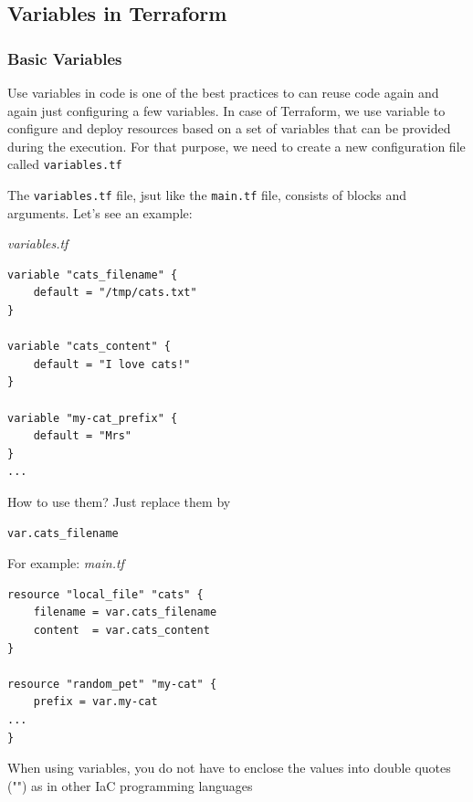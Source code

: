 \documentclass{article}
\newenvironment{blocktemplateIII}[1]{%
    \tcolorbox[beamer,%
    noparskip,breakable,
    ,colframe=Red,%
    colbacklower=LimeGreen!75!LightGreen,%
    title=#1]}%
    {\endtcolorbox}
\newenvironment{codetemplate}[1][]{%
  \mybasecolorbox[#1]
  \itshape
}{%
  \endmybasecolorbox
}
\begin{document}
\subsection{Variables in Terraform}

\subsubsection{Basic Variables}

Use variables in code is one of the best practices to can reuse code again and again just configuring a few variables. In case of Terraform, we use variable to configure and deploy resources based on a set of variables that can be provided during the execution. For that purpose, we need to create a new configuration file called \verb+variables.tf+

The \verb+variables.tf+ file, jsut like the \verb+main.tf+ file, consists of blocks and arguments. Let's see an example:

\begin{codetemplate}{variables.tf}
\begin{verbatim}
variable "cats_filename" {
    default = "/tmp/cats.txt"
}

variable "cats_content" {
    default = "I love cats!"
}

variable "my-cat_prefix" {
    default = "Mrs"
}
...
\end{verbatim}
\end{codetemplate}

How to use them? Just replace them by
\begin{codetemplate}{}
\begin{verbatim}
var.cats_filename
\end{verbatim}
\end{codetemplate}

For example:
\begin{codetemplate}{main.tf}
\begin{verbatim}
resource "local_file" "cats" {
    filename = var.cats_filename
    content  = var.cats_content
}

resource "random_pet" "my-cat" {
    prefix = var.my-cat
...  
}
\end{verbatim}
\end{codetemplate}

\begin{blocktemplateIII}{WARNING}
When using variables, you do not have to enclose the values into double quotes ("") as in other IaC programming languages
\end{blocktemplateIII}
\end{document}
